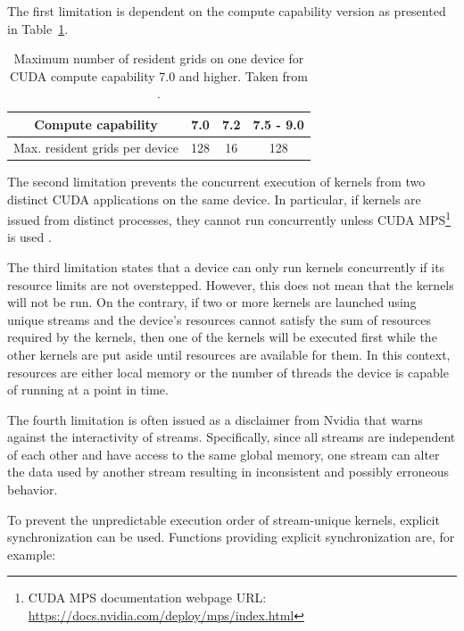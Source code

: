 The first limitation is dependent on the compute capability version as presented in Table~\ref{Table:theory->CUDA->concurrent-kernel-execution->maximum-resident-grids-per-device}.

\begin{table}[ht!]
	\centering
	\renewcommand{\arraystretch}{1.5}
	\begin{tabular}{ |c|c|c|c| } 
		\hline
		Compute capability 			   & 7.0 & 7.2 & 7.5 - 9.0 \\
		\hline
		Max. resident grids per device & 128 & 16  & 128       \\
		\hline
	\end{tabular}
	\caption{Maximum number of resident grids on one device for CUDA compute capability 7.0 and higher.
		Taken from  \cite{NVIDIADecember2022}.
	}
	\label{Table:theory->CUDA->concurrent-kernel-execution->maximum-resident-grids-per-device}
\end{table}

The second limitation prevents the concurrent execution of kernels from two distinct CUDA applications on the same device.
In particular, if kernels are issued from distinct processes, they cannot run concurrently unless CUDA MPS\footnote{CUDA MPS documentation webpage URL: \url{https://docs.nvidia.com/deploy/mps/index.html}} is used \cite{Crovella16December2016, Crovella17August2017}.

The third limitation states that a device can only run kernels concurrently if its resource limits are not overstepped.
However, this does not mean that the kernels will not be run.
On the contrary, if two or more kernels are launched using unique streams and the device's resources cannot satisfy the sum of resources required by the kernels, then one of the kernels will be executed first while the other kernels are put aside until resources are available for them.
In this context, resources are either local memory or the number of threads the device is capable of running at a point in time.

The fourth limitation is often issued as a disclaimer from Nvidia that warns against the interactivity of streams.
Specifically, since all streams are independent of each other and have access to the same global memory, one stream can alter the data used by another stream resulting in inconsistent and possibly erroneous behavior.

To prevent the unpredictable execution order of stream-unique kernels, explicit synchronization can be used.
Functions providing explicit synchronization are, for example:

